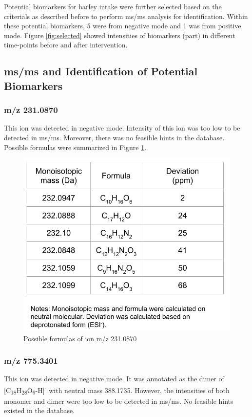 Potential biomarkers for barley intake were further selected based on the criterials as described before to perform \acrshort{ms/ms} analysis for identification. Within these potential biomarkers, 5 were from negative mode and 1 was from positive mode. Figure \ref{fig:selected} showed intensities of biomarkers (part) in different time-points before and after intervention.

\subsection{\acrfull{ms/ms} and Identification of Potential Biomarkers}
\subsubsection{m/z 231.0870}
This ion was detected in negative mode. Intensity of this ion was too low to be detected in \acrshort{ms/ms}. Moreover, there was no feasible hints in the database. Possible formulas were summarized in Figure \ref{fig:231p0870}.
\begin{figure}[h]
    \centering
    \includegraphics[scale=0.5]{images/231p0870.pdf}
    \caption{Possible formulas of ion m/z 231.0870}
    \label{fig:231p0870}
\end{figure}

\subsubsection{m/z 775.3401}
This ion was detected in negative mode. It was annotated as the dimer of [C\textsubscript{18}H\textsubscript{28}O\textsubscript{9}-H]\textsuperscript{-} with neutral mass 388.1735. However, the intensities of both monomer and dimer were too low to be detected in \acrshort{ms/ms}. No feasible hints existed in the database.

